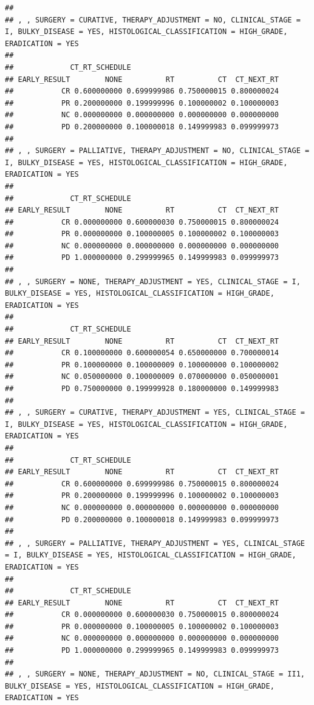 \documentclass[]{article}
\begin{document}
\begin{verbatim}
## 
## , , SURGERY = CURATIVE, THERAPY_ADJUSTMENT = NO, CLINICAL_STAGE = I, BULKY_DISEASE = YES, HISTOLOGICAL_CLASSIFICATION = HIGH_GRADE, ERADICATION = YES
## 
##             CT_RT_SCHEDULE
## EARLY_RESULT        NONE          RT          CT  CT_NEXT_RT
##           CR 0.600000000 0.699999986 0.750000015 0.800000024
##           PR 0.200000000 0.199999996 0.100000002 0.100000003
##           NC 0.000000000 0.000000000 0.000000000 0.000000000
##           PD 0.200000000 0.100000018 0.149999983 0.099999973
## 
## , , SURGERY = PALLIATIVE, THERAPY_ADJUSTMENT = NO, CLINICAL_STAGE = I, BULKY_DISEASE = YES, HISTOLOGICAL_CLASSIFICATION = HIGH_GRADE, ERADICATION = YES
## 
##             CT_RT_SCHEDULE
## EARLY_RESULT        NONE          RT          CT  CT_NEXT_RT
##           CR 0.000000000 0.600000030 0.750000015 0.800000024
##           PR 0.000000000 0.100000005 0.100000002 0.100000003
##           NC 0.000000000 0.000000000 0.000000000 0.000000000
##           PD 1.000000000 0.299999965 0.149999983 0.099999973
## 
## , , SURGERY = NONE, THERAPY_ADJUSTMENT = YES, CLINICAL_STAGE = I, BULKY_DISEASE = YES, HISTOLOGICAL_CLASSIFICATION = HIGH_GRADE, ERADICATION = YES
## 
##             CT_RT_SCHEDULE
## EARLY_RESULT        NONE          RT          CT  CT_NEXT_RT
##           CR 0.100000000 0.600000054 0.650000000 0.700000014
##           PR 0.100000000 0.100000009 0.100000000 0.100000002
##           NC 0.050000000 0.100000009 0.070000000 0.050000001
##           PD 0.750000000 0.199999928 0.180000000 0.149999983
## 
## , , SURGERY = CURATIVE, THERAPY_ADJUSTMENT = YES, CLINICAL_STAGE = I, BULKY_DISEASE = YES, HISTOLOGICAL_CLASSIFICATION = HIGH_GRADE, ERADICATION = YES
## 
##             CT_RT_SCHEDULE
## EARLY_RESULT        NONE          RT          CT  CT_NEXT_RT
##           CR 0.600000000 0.699999986 0.750000015 0.800000024
##           PR 0.200000000 0.199999996 0.100000002 0.100000003
##           NC 0.000000000 0.000000000 0.000000000 0.000000000
##           PD 0.200000000 0.100000018 0.149999983 0.099999973
## 
## , , SURGERY = PALLIATIVE, THERAPY_ADJUSTMENT = YES, CLINICAL_STAGE = I, BULKY_DISEASE = YES, HISTOLOGICAL_CLASSIFICATION = HIGH_GRADE, ERADICATION = YES
## 
##             CT_RT_SCHEDULE
## EARLY_RESULT        NONE          RT          CT  CT_NEXT_RT
##           CR 0.000000000 0.600000030 0.750000015 0.800000024
##           PR 0.000000000 0.100000005 0.100000002 0.100000003
##           NC 0.000000000 0.000000000 0.000000000 0.000000000
##           PD 1.000000000 0.299999965 0.149999983 0.099999973
## 
## , , SURGERY = NONE, THERAPY_ADJUSTMENT = NO, CLINICAL_STAGE = II1, BULKY_DISEASE = YES, HISTOLOGICAL_CLASSIFICATION = HIGH_GRADE, ERADICATION = YES

\end{verbatim}
\end{document}

